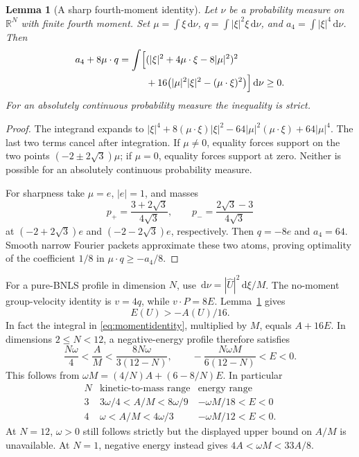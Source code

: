 \documentclass[11pt]{article}
\newtheorem{lemma}[theorem]{Lemma}
\theoremstyle{definition}
\theoremstyle{remark}
\newcommand{\R}{\mathbb R}
\newcommand{\dd}{\,\mathrm d}
\begin{document}
\begin{lemma}[A sharp fourth-moment identity]\label{lem:momentone}
Let $\nu$ be a probability measure on $\R^N$ with finite fourth moment. Set $\mu=\int\xi\dd\nu$, $q=\int|\xi|^2\xi\dd\nu$, and $a_4=\int|\xi|^4\dd\nu$. Then
\begin{align}\label{eq:momentidentity}
 a_4+8\mu\cdot q
 =\int\Bigl[&(|\xi|^2+4\mu\cdot\xi-8|\mu|^2)^2\notag\\
 &+16\bigl(|\mu|^2|\xi|^2-(\mu\cdot\xi)^2\bigr)\Bigr]\dd\nu\ge0.
\end{align}
For an absolutely continuous probability measure the inequality is strict.
\end{lemma}
\begin{proof}
The integrand expands to $|\xi|^4+8(\mu\cdot\xi)|\xi|^2-64|\mu|^2(\mu\cdot\xi)+64|\mu|^4$. The last two terms cancel after integration. If $\mu\ne0$, equality forces support on the two points $(-2\pm2\sqrt3)\mu$; if $\mu=0$, equality forces support at zero. Neither is possible for an absolutely continuous probability measure.

For sharpness take $\mu=e$, $|e|=1$, and masses
\[
 p_+=\frac{3+2\sqrt3}{4\sqrt3},\qquad
 p_-=\frac{2\sqrt3-3}{4\sqrt3}
\]
at $(-2+2\sqrt3)e$ and $(-2-2\sqrt3)e$, respectively. Then $q=-8e$ and $a_4=64$. Smooth narrow Fourier packets approximate these two atoms, proving optimality of the coefficient $1/8$ in $\mu\cdot q\ge-a_4/8$.
\end{proof}

For a pure-BNLS profile in dimension $N$, use $\dd\nu=|\widehat U|^2\dd\xi/M$. The no-moment group-velocity identity is $v=4q$, while $v\cdot P=8E$. Lemma~\ref{lem:momentone} gives
\begin{equation}\label{eq:energybound}
 E(U)>-A(U)/16.
\end{equation}
In fact the integral in \eqref{eq:momentidentity}, multiplied by $M$, equals $A+16E$. In dimensions $2\le N<12$, a negative-energy profile therefore satisfies
\begin{equation}\label{eq:generalparameters}
 \frac{N\omega}{4}<\frac AM<\frac{8N\omega}{3(12-N)},
 \qquad -\frac{N\omega M}{6(12-N)}<E<0.
\end{equation}
This follows from $\omega M=(4/N)A+(6-8/N)E$. In particular
\[
 \begin{array}{c|c|c}
 N&\text{kinetic-to-mass range}&\text{energy range}\\\hline
 3&3\omega/4<A/M<8\omega/9&-\omega M/18<E<0\\
 4&\omega<A/M<4\omega/3&-\omega M/12<E<0.
 \end{array}
\]
At $N=12$, $\omega>0$ still follows strictly but the displayed upper bound on $A/M$ is unavailable. At $N=1$, negative energy instead gives $4A<\omega M<33A/8$.
\end{document}
